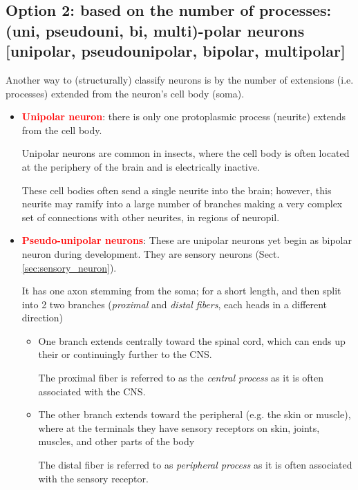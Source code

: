\subsection{Option 2: based on the number of processes: (uni, pseudouni,
bi, multi)-polar neurons [unipolar, pseudounipolar, bipolar, multipolar]}
\label{sec:neuron-classify-multi-pseudo-bi-polar}
\label{sec:multi-polar-neurons}
\label{sec:bipolar-neurons}
\label{sec:pseudo-unipolar-neurons}
\label{sec:unipolar-neurons}

Another way to (structurally) classify neurons is by the number of extensions
(i.e. processes) extended from the neuron's cell body (soma).

\begin{itemize}

\item \textcolor{red}{\bf Unipolar neuron}: there is only one protoplasmic
process (neurite) extends from the cell body.

Unipolar neurons are common in insects, where the cell body is often located at
the periphery of the brain and is electrically inactive.

These cell bodies often send a single neurite into the brain; however, this
neurite may ramify into a large number of branches making a very complex set of
connections with other neurites, in regions of neuropil.  

\item \textcolor{red}{\bf Pseudo-unipolar neurons}: 
These are unipolar neurons yet begin as bipolar neuron during development. They
are sensory neurons (Sect.\ref{sec:sensory_neuron}).

It has one axon stemming from the soma; for a short length, and then split into
2 two branches ({\it proximal} and {\it distal fibers}, each heads in a different
 direction)
\begin{itemize}
  \item One branch extends centrally toward the spinal cord, which can ends up
  their or continuingly further to the CNS.

The proximal fiber is referred to as the {\it central process} as it is
often associated with the CNS.
    
  \item The other branch extends toward the peripheral (e.g. the skin or
  muscle), where at the terminals they have sensory receptors on skin, joints,
  muscles, and other parts of the body

The distal fiber is referred to as {\it peripheral process} as it is often
associated  with the sensory receptor.
 

\end{itemize}
\end{itemize}
